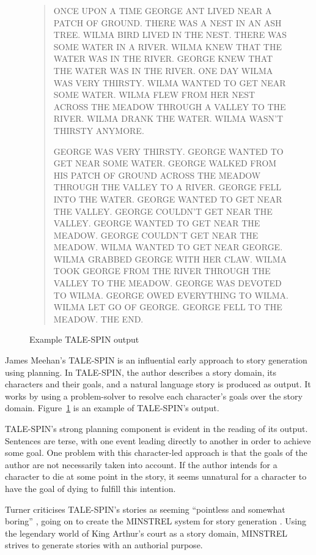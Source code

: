 \documentclass[11pt]{report}
\begin{document}
\begin{figure}[!t]
\begin{quote}
  ONCE UPON A TIME GEORGE ANT LIVED NEAR A PATCH OF GROUND. THERE WAS A NEST IN AN ASH TREE. WILMA BIRD LIVED IN THE NEST. THERE WAS SOME WATER IN A RIVER. WILMA KNEW THAT THE WATER WAS IN THE RIVER. GEORGE KNEW THAT THE WATER WAS IN THE RIVER. ONE DAY WILMA WAS VERY THIRSTY. WILMA WANTED TO GET NEAR SOME WATER. WILMA FLEW FROM HER NEST ACROSS THE MEADOW THROUGH A VALLEY TO THE RIVER. WILMA DRANK THE WATER. WILMA WASN'T THIRSTY ANYMORE.

GEORGE WAS VERY THIRSTY. GEORGE WANTED TO GET NEAR SOME WATER. GEORGE WALKED FROM HIS PATCH OF GROUND ACROSS THE MEADOW THROUGH THE VALLEY TO A RIVER. GEORGE FELL INTO THE WATER. GEORGE WANTED TO GET NEAR THE VALLEY. GEORGE COULDN'T GET NEAR THE VALLEY. GEORGE WANTED TO GET NEAR THE MEADOW. GEORGE COULDN'T GET NEAR THE MEADOW. WILMA WANTED TO GET NEAR GEORGE. WILMA GRABBED GEORGE WITH HER CLAW. WILMA TOOK GEORGE FROM THE RIVER THROUGH THE VALLEY TO THE MEADOW. GEORGE WAS DEVOTED TO WILMA. GEORGE OWED EVERYTHING TO WILMA. WILMA LET GO OF GEORGE. GEORGE FELL TO THE MEADOW. THE END.
\end{quote}
\caption{Example TALE-SPIN output}\label{fig:tspin}
\end{figure}

James Meehan's TALE-SPIN \citep{meehan1977tale} is an influential early approach to story generation using planning. In TALE-SPIN, the author describes a story domain, its characters and their goals, and a natural language story is produced as output. It works by using a problem-solver to resolve each character's goals over the story domain. Figure~\ref{fig:tspin} is an example of TALE-SPIN's output.

TALE-SPIN's strong planning component is evident in the reading of its output. Sentences are terse, with one event leading directly to another in order to achieve some goal. One problem with this character-led approach is that the goals of the author are not necessarily taken into account. If the author intends for a character to die at some point in the story, it seems unnatural for a character to have the goal of dying to fulfill this intention.

 Turner criticises TALE-SPIN's stories as seeming ``pointless and somewhat boring'' \citep{turner1986thematic}, going on to create the MINSTREL system for story generation \citep{turner1993minstrel}. Using the legendary world of King Arthur's court as a story domain, MINSTREL strives to generate stories with an authorial purpose.
\end{document}
